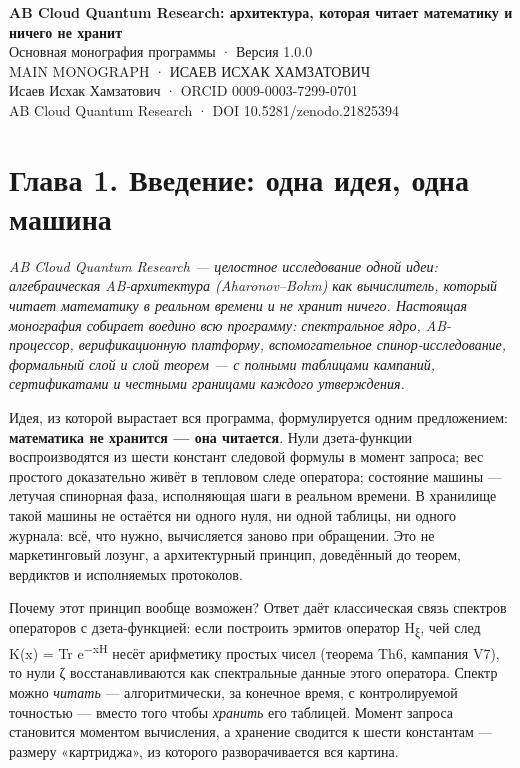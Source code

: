 \documentclass[11pt,a4paper]{article}
\begin{document}
\begin{center}
{\LARGE\bfseries AB Cloud Quantum Research: архитектура, которая читает математику и ничего не хранит}\\[8pt]
{\large Основная монография программы · Версия 1.0.0}\\[6pt]
{\color{copper}\small MAIN MONOGRAPH · ИСАЕВ ИСХАК ХАМЗАТОВИЧ}\\[4pt]
{\small Исаев Исхак Хамзатович · ORCID 0009-0003-7299-0701}\\[2pt]
{\small AB Cloud Quantum Research · DOI 10.5281/zenodo.21825394}
\end{center}

\tableofcontents
\newpage

\section{Глава 1. Введение: одна идея, одна машина}

\noindent\textit{\color{copper}AB Cloud Quantum Research — целостное исследование одной идеи: алгебраическая AB-архитектура (Aharonov–Bohm) как вычислитель, который читает математику в реальном времени и не хранит ничего. Настоящая монография собирает воедино всю программу: спектральное ядро, AB-процессор, верификационную платформу, вспомогательное спинор-исследование, формальный слой и слой теорем — с полными таблицами кампаний, сертификатами и честными границами каждого утверждения.}

Идея, из которой вырастает вся программа, формулируется одним предложением: \textbf{математика не хранится — она читается}. Нули дзета-функции воспроизводятся из шести констант следовой формулы в момент запроса; вес простого доказательно живёт в тепловом следе оператора; состояние машины — летучая спинорная фаза, исполняющая шаги в реальном времени. В хранилище такой машины не остаётся ни одного нуля, ни одной таблицы, ни одного журнала: всё, что нужно, вычисляется заново при обращении. Это не маркетинговый лозунг, а архитектурный принцип, доведённый до теорем, вердиктов и исполняемых протоколов.

Почему этот принцип вообще возможен? Ответ даёт классическая связь спектров операторов с дзета-функцией: если построить эрмитов оператор H\textsubscript{ξ}, чей след K(x) = Tr e\textsuperscript{−xH} несёт арифметику простых чисел (теорема Th6, кампания V7), то нули ζ восстанавливаются как спектральные данные этого оператора. Спектр можно \emph{читать} — алгоритмически, за конечное время, с контролируемой точностью — вместо того чтобы \emph{хранить} его таблицей. Момент запроса становится моментом вычисления, а хранение сводится к шести константам — размеру «картриджа», из которого разворачивается вся картина.
\end{document}
